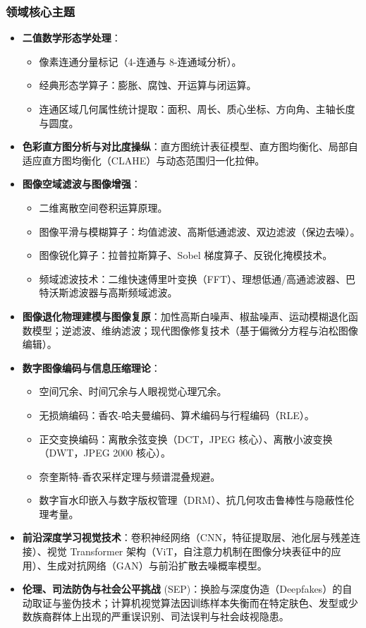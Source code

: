 \subsubsection{领域核心主题}
\begin{itemize}
    \item \textbf{二值数学形态学处理}：
    \begin{itemize}
        \item 像素连通分量标记（4-连通与 8-连通域分析）。
        \item 经典形态学算子：膨胀、腐蚀、开运算与闭运算。
        \item 连通区域几何属性统计提取：面积、周长、质心坐标、方向角、主轴长度与圆度。
    \end{itemize}
    \item \textbf{色彩直方图分析与对比度操纵}：直方图统计表征模型、直方图均衡化、局部自适应直方图均衡化（CLAHE）与动态范围归一化拉伸。
    \item \textbf{图像空域滤波与图像增强}：
    \begin{itemize}
        \item 二维离散空间卷积运算原理。
        \item 图像平滑与模糊算子：均值滤波、高斯低通滤波、双边滤波（保边去噪）。
        \item 图像锐化算子：拉普拉斯算子、Sobel 梯度算子、反锐化掩模技术。
        \item 频域滤波技术：二维快速傅里叶变换（FFT）、理想低通/高通滤波器、巴特沃斯滤波器与高斯频域滤波。
    \end{itemize}
    \item \textbf{图像退化物理建模与图像复原}：加性高斯白噪声、椒盐噪声、运动模糊退化函数模型；逆滤波、维纳滤波；现代图像修复技术（基于偏微分方程与泊松图像编辑）。
    \item \textbf{数字图像编码与信息压缩理论}：
    \begin{itemize}
        \item 空间冗余、时间冗余与人眼视觉心理冗余。
        \item 无损熵编码：香农-哈夫曼编码、算术编码与行程编码（RLE）。
        \item 正交变换编码：离散余弦变换（DCT，JPEG 核心）、离散小波变换（DWT，JPEG 2000 核心）。
        \item 奈奎斯特-香农采样定理与频谱混叠规避。
        \item 数字盲水印嵌入与数字版权管理（DRM）、抗几何攻击鲁棒性与隐蔽性伦理考量。
    \end{itemize}
    \item \textbf{前沿深度学习视觉技术}：卷积神经网络（CNN，特征提取层、池化层与残差连接）、视觉 Transformer 架构（ViT，自注意力机制在图像分块表征中的应用）、生成对抗网络（GAN）与前沿扩散去噪概率模型。
    \item \textbf{伦理、司法防伪与社会公平挑战} (SEP)：换脸与深度伪造（Deepfakes）的自动取证与鉴伪技术；计算机视觉算法因训练样本失衡而在特定肤色、发型或少数族裔群体上出现的严重误识别、司法误判与社会歧视隐患。
\end{itemize}


